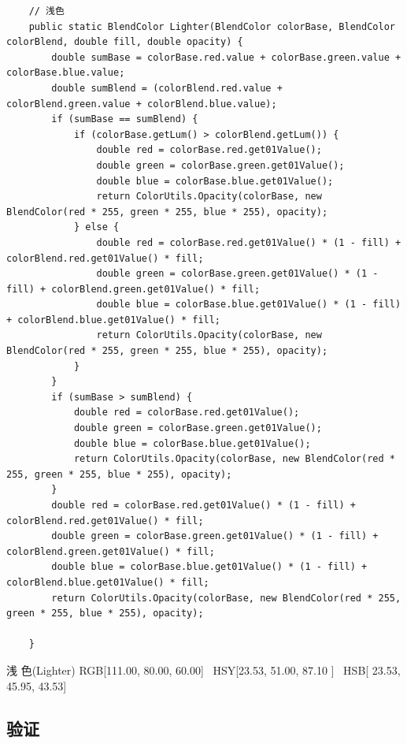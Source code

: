 \begin{lstlisting}
	// 浅色
	public static BlendColor Lighter(BlendColor colorBase, BlendColor colorBlend, double fill, double opacity) {
		double sumBase = colorBase.red.value + colorBase.green.value + colorBase.blue.value;
		double sumBlend = (colorBlend.red.value + colorBlend.green.value + colorBlend.blue.value);
		if (sumBase == sumBlend) {
			if (colorBase.getLum() > colorBlend.getLum()) {
				double red = colorBase.red.get01Value();
				double green = colorBase.green.get01Value();
				double blue = colorBase.blue.get01Value();
				return ColorUtils.Opacity(colorBase, new BlendColor(red * 255, green * 255, blue * 255), opacity);
			} else {
				double red = colorBase.red.get01Value() * (1 - fill) + colorBlend.red.get01Value() * fill;
				double green = colorBase.green.get01Value() * (1 - fill) + colorBlend.green.get01Value() * fill;
				double blue = colorBase.blue.get01Value() * (1 - fill) + colorBlend.blue.get01Value() * fill;
				return ColorUtils.Opacity(colorBase, new BlendColor(red * 255, green * 255, blue * 255), opacity);
			}
		}
		if (sumBase > sumBlend) {
			double red = colorBase.red.get01Value();
			double green = colorBase.green.get01Value();
			double blue = colorBase.blue.get01Value();
			return ColorUtils.Opacity(colorBase, new BlendColor(red * 255, green * 255, blue * 255), opacity);
		}
		double red = colorBase.red.get01Value() * (1 - fill) + colorBlend.red.get01Value() * fill;
		double green = colorBase.green.get01Value() * (1 - fill) + colorBlend.green.get01Value() * fill;
		double blue = colorBase.blue.get01Value() * (1 - fill) + colorBlend.blue.get01Value() * fill;
		return ColorUtils.Opacity(colorBase, new BlendColor(red * 255, green * 255, blue * 255), opacity);
		
	}
\end{lstlisting}

\begin{result}
\item 浅    色(Lighter)       RGB[111.00,  80.00,  60.00]~ HSY[23.53,  51.00,  87.10 ]~ HSB[ 23.53,  45.95,  43.53]
\end{result}
\newpage
\subsection{ 验证}


